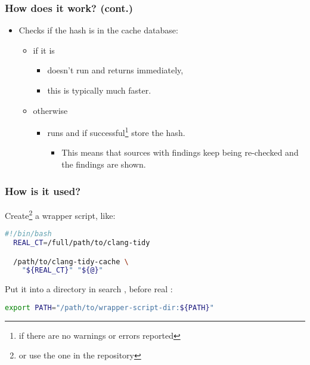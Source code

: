 \documentclass[compress,table,xcolor=table]{beamer}
\begin{document}
\begin{frame}
  \frametitle{How does it work? (cont.)}
    \LARGE
    \begin{itemize}
        \item Checks if the hash is in the cache database:
        \begin{itemize}
            \Large
            \item if it is
            \begin{itemize}
            \item doesn't run  and returns immediately,
            \item this is typically {\larger much} faster.
            \end{itemize}
            \item otherwise
            \begin{itemize}
            \item runs  and if
                successful\footnote{if there are no warnings or errors reported}
                store the hash.
            \begin{itemize}
            \large
            \item This means that {\larger sources with findings keep being
                re-checked} and the findings are shown.
            \end{itemize}
            \end{itemize}
        \end{itemize}
    \end{itemize}
\end{frame}
\begin{frame}[fragile]
  \frametitle{How is it used?}
  \LARGE
  Create\footnote{or use the one in the repository} a wrapper script, like:
  \begin{lstlisting}[language=bash]
  #!/bin/bash
  REAL_CT=/full/path/to/clang-tidy

  /path/to/clang-tidy-cache \
    "${REAL_CT}" "${@}"
  \end{lstlisting}
  Put it into a directory in search , before real
  \cmdname{clang-tidy}:
  \begin{lstlisting}[language=bash]
  export PATH="/path/to/wrapper-script-dir:${PATH}"
  \end{lstlisting}
\end{frame}
\end{document}
